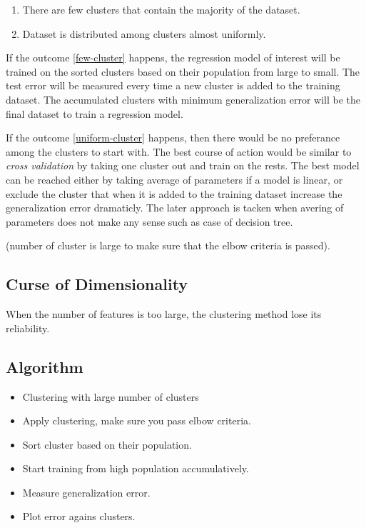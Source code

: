 \documentclass{article}
\begin{document}
\begin{enumerate}
\item \label{few-cluster} There are few clusters that contain the majority of the dataset.
\item \label{uniform-cluster} Dataset is distributed among clusters almost uniformly.
\end{enumerate}

If the outcome \ref{few-cluster}  happens, the regression model of interest will be trained on the sorted clusters based on their population from large to small. The test error will be measured every time a new cluster is added to the training dataset. The accumulated clusters with minimum generalization error will be the final dataset to train a regression model.

If the outcome \ref{uniform-cluster}  happens, then there would be no preferance among the clusters to start with. The best course of action would be similar to {\em cross validation} by taking one cluster  out and train on the rests. The best model can be reached either by taking average of parameters if a model is linear,  or exclude the cluster that when it is added to the training dataset increase the generalization error dramaticly. The later approach is tacken when avering of parameters does not make any sense such as case of decision tree. 

(number of cluster is large to make sure that the elbow criteria is passed).


\subsection{Curse of Dimensionality}
When the number of features is too large, the clustering method lose its reliability.


\subsection{Algorithm}
\begin{itemize}
\item Clustering with large number of clusters
\item Apply clustering, make sure you pass elbow criteria.
\item Sort cluster based on their population.
\item Start training from high population accumulatively.
\item Measure generalization error.
\item Plot error agains clusters.
\end{itemize}
\end{document}
